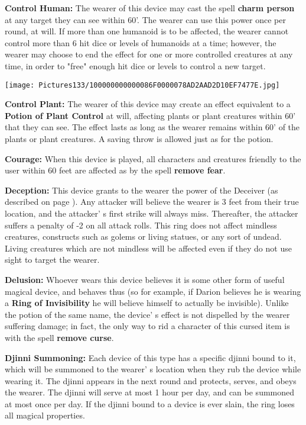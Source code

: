 \documentclass[a4paper,twoside,openany,10pt]{book}
\begin{document}
\begin{multicols}{2}
\textbf{Control Human:} The wearer of this device may cast the spell \textbf{charm person} at any target they can see within 60'. The wearer can use this power once per round, at will. If more than one humanoid is to be affected, the wearer cannot control more than 6 hit dice or levels of humanoids at a time; however, the wearer may choose to end the effect for one or more controlled creatures at any time, in order to "free" enough hit dice or levels to control a new target.

\begin{center}
	\texttt{[image: Pictures133/100000000000086F0000078AD2AAD2D10EF7477E.jpg]}
\end{center}

\textbf{Control Plant:} The wearer of this device may create an effect equivalent to a \textbf{Potion of Plant Control} at will, affecting plants or plant creatures within 60' that they can see. The effect lasts as long as the wearer remains within 60' of the plants or plant creatures. A saving throw is allowed just as for the potion.

\textbf{Courage: }When this device is played, all characters and creatures friendly to the user within 60 feet are affected as by the spell \textbf{remove fear}.

\textbf{Deception:} This device grants to the wearer the power of the Deceiver (as described on page \hyperlink{deceiver-panther-hydra}{\pageref{deceiver-panther-hydra}}). Any attacker will believe the wearer is 3 feet from their true location, and the attacker' s first strike will always miss. Thereafter, the attacker suffers a penalty of -2 on all attack rolls. This ring does not affect mindless creatures, constructs such as golems or living statues, or any sort of undead. Living creatures which are not mindless will be affected even if they do not use sight to target the wearer.

\textbf{Delusion:} Whoever wears this device believes it is some other form of useful magical device, and behaves thus (so for example, if Darion believes he is wearing a \textbf{Ring of Invisibility} he will believe himself to actually be invisible). Unlike the potion of the same name, the device' s effect is not dispelled by the wearer suffering damage; in fact, the only way to rid a character of this cursed item is with the spell \textbf{remove curse}.

\textbf{Djinni Summoning:} Each device of this type has a specific djinni bound to it, which will be summoned to the wearer' s location when they rub the device while wearing it. The djinni appears in the next round and protects, serves, and obeys the wearer. The djinni will serve at most 1 hour per day, and can be summoned at most once per day. If the djinni bound to a device is ever slain, the ring loses all magical properties.


\end{multicols}
\end{document}
